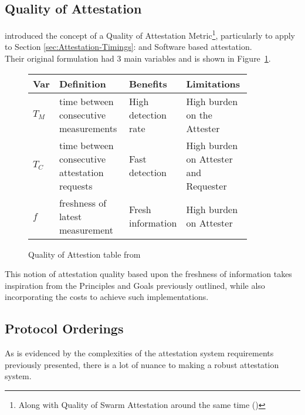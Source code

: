 \documentclass[acmsmall]{acmart}
\theoremstyle{definition}
\newcommand{\secref}[1]{Section \ref{#1}: \nameref{#1}}
\begin{document}
\subsection{Quality of Attestation}
\citet{carpent2018erasmus} introduced the concept of a Quality of Attestation Metric\footnote{Along with Quality of Swarm Attestation around the same time (\citet{carpent2017lightweight})}, particularly to apply to \secref{sec:Attestation-Timings} and
Software based attestation. \\
Their original formulation had 3 main variables and is shown in Figure~\ref{fig:Quality-of-Attestation-Table}.
\begin{figure}[ht]
  \centering
  \begin{tabular}{| p{0.06\linewidth} || p{0.32\linewidth} | p{0.2\linewidth} | p{0.3\linewidth} |}
    \hline
    Var   & Definition                                        & Benefits            & Limitations                           \\
    \hline \hline
    $T_M$ & time between consecutive measurements         & High detection rate & High burden on the Attester           \\
    $T_C$ & time between consecutive attestation requests & Fast detection      & High burden on Attester and Requester \\
    $f$   & freshness of latest measurement                   & Fresh information   & High burden on Attester               \\ \hline
  \end{tabular}
  \caption{Quality of Attestion table from \citet{carpent2018erasmus}}
  \label{fig:Quality-of-Attestation-Table}
\end{figure}
This notion of attestation quality based upon the freshness of information 
takes inspiration from the Principles and Goals previously outlined,
while also incorporating the costs to achieve such implementations.

\subsection{Protocol Orderings}
As is evidenced by the complexities of the attestation system requirements
previously presented, there is a lot of nuance to making a 
robust attestation system.
\end{document}
